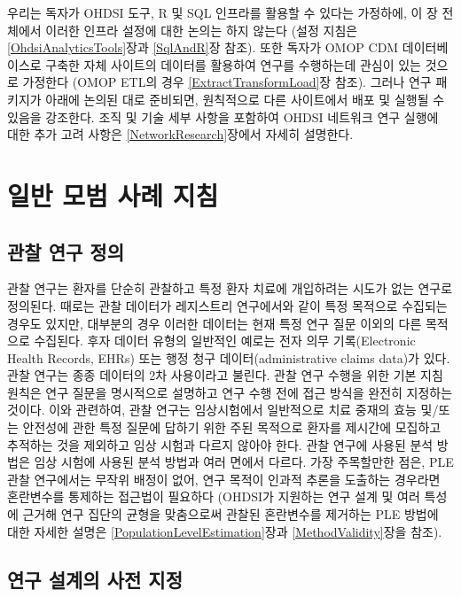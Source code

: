 \documentclass[11pt]{book}
\theoremstyle{definition}
\theoremstyle{definition}
\theoremstyle{definition}
\theoremstyle{remark}
\begin{document}
우리는 독자가 OHDSI 도구, R 및 SQL 인프라를 활용할 수 있다는 가정하에,
이 장 전체에서 이러한 인프라 설정에 대한 논의는 하지 않는다 (설정 지침은
\ref{OhdsiAnalyticsTools}장과 \ref{SqlAndR}장 참조). 또한 독자가 OMOP
CDM 데이터베이스로 구축한 자체 사이트의 데이터를 활용하여 연구를
수행하는데 관심이 있는 것으로 가정한다 (OMOP ETL의 경우
\ref{ExtractTransformLoad}장 참조). 그러나 연구 패키지가 아래에 논의된
대로 준비되면, 원칙적으로 다른 사이트에서 배포 및 실행될 수 있음을
강조한다. 조직 및 기술 세부 사항을 포함하여 OHDSI 네트워크 연구 실행에
대한 추가 고려 사항은 \ref{NetworkResearch}장에서 자세히 설명한다.

\section{일반 모범 사례 지침}\label{---}

\subsection{관찰 연구 정의}\label{--}

관찰 연구는 환자를 단순히 관찰하고 특정 환자 치료에 개입하려는 시도가
없는 연구로 정의된다. 때로는 관찰 데이터가 레지스트리 연구에서와 같이
특정 목적으로 수집되는 경우도 있지만, 대부분의 경우 이러한 데이터는 현재
특정 연구 질문 이외의 다른 목적으로 수집된다. 후자 데이터 유형의
일반적인 예로는 전자 의무 기록(Electronic Health Records, EHRs) 또는
행정 청구 데이터(administrative claims data)가 있다. 관찰 연구는 종종
데이터의 2차 사용이라고 불린다. 관찰 연구 수행을 위한 기본 지침 원칙은
연구 질문을 명시적으로 설명하고 연구 수행 전에 접근 방식을 완전히
지정하는 것이다. 이와 관련하여, 관찰 연구는 임상시험에서 일반적으로 치료
중재의 효능 및/또는 안전성에 관한 특정 질문에 답하기 위한 주된 목적으로
환자를 제시간에 모집하고 추적하는 것을 제외하고 임상 시험과 다르지
않아야 한다. 관찰 연구에 사용된 분석 방법은 임상 시험에 사용된 분석
방법과 여러 면에서 다르다. 가장 주목할만한 점은, PLE 관찰 연구에서는
무작위 배정이 없어, 연구 목적이 인과적 추론을 도출하는 경우라면
혼란변수를 통제하는 접근법이 필요하다 (OHDSI가 지원하는 연구 설계 및
여러 특성에 근거해 연구 집단의 균형을 맞춤으로써 관찰된 혼란변수를
제거하는 PLE 방법에 대한 자세한 설명은
\ref{PopulationLevelEstimation}장과 \ref{MethodValidity}장을 참조).

\subsection{연구 설계의 사전 지정}\label{---}
\end{document}
